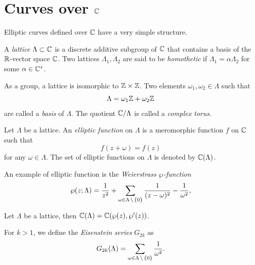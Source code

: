 \section{Curves over \texorpdfstring{$\mathbb{C}$}{C}}
\label{sec:curves-over-c}
Elliptic curves defined over $\mathbb{C}$ have a very simple structure.

\begin{definition}[Lattice]
  A \emph{lattice} $\Lambda\subset\mathbb{C}$ is a discrete
  additive subgroup of $\mathbb{C}$ that contains a basis of the $\mathbb{R}$-vector
  space $\mathbb{C}$. Two lattices $\Lambda_1,\Lambda_2$ are said to be
  \emph{homothetic} if $\Lambda_1=\alpha\Lambda_2$ for some
  $\alpha\in\mathbb{C}^{\ast}$.
\end{definition}

As a group, a lattice is isomorphic to $\mathbb{Z}\times\mathbb{Z}$. Two elements
$\omega_1,\omega_2\in\Lambda$ such that
\begin{equation}
  \label{eq:135}
  \Lambda = \omega_1\mathbb{Z} + \omega_2\mathbb{Z}
\end{equation}
are called a \emph{basis} of $\Lambda$. The quotient $\mathbb{C}/\Lambda$ is
called a \emph{complex torus}.

\begin{definition}
  Let $\Lambda$ be a lattice. An
  \emph{elliptic function} on $\Lambda$ is a
  meromorphic function $f$ on $\mathbb{C}$ such that
  \begin{equation}
    \label{eq:141}
    f(z+\omega) = f(z)
  \end{equation}
  for any $\omega\in\Lambda$.  The set of elliptic functions on
  $\Lambda$ is denoted by $\mathbb{C}(\Lambda)$.
\end{definition}

An example of elliptic function is the
\emph{Weierstrass
  $\wp$-function}
\begin{equation}
  \label{eq:142}
  \wp(z;\Lambda) = \frac{1}{z^2} + \sum_{\omega\in\Lambda\,\backslash\,\{0\}}\frac{1}{(z-\omega)^2}-\frac{1}{\omega^2}
  \text{,}
\end{equation}
\begin{theorem}
  Let $\Lambda$ be a lattice, then $\mathbb{C}(\Lambda) = \mathbb{C}(\wp(z),\wp'(z))$.
\end{theorem}

For $k>1$, we define the \emph{Eisenstein
  series} $G_{2k}$ as
\begin{equation}
  \label{eq:143}
  G_{2k}(\Lambda) = \sum_{\omega\in\Lambda\,\backslash\,\{0\}}\frac{1}{\omega^2}
  \text{.}
\end{equation}

